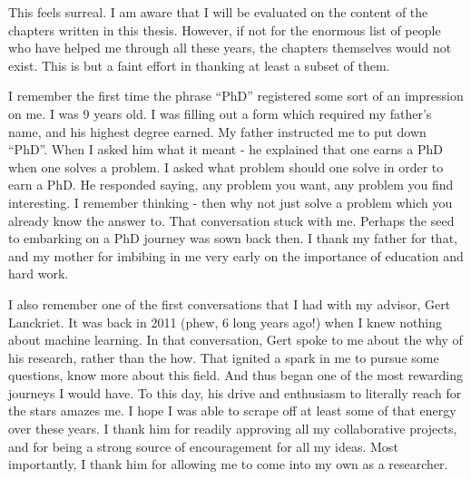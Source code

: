 \begin{frontmatter}
%


%
\tableofcontents
\listoffigures  %
\listoftables   %



%
%
\begin{acknowledgements}
This feels surreal.  I am aware that I will be evaluated on the content of the chapters written in this thesis.  However, if not for the enormous list of people who have helped me through all these years, the chapters themselves would not exist.  This is but a faint effort in thanking at least a subset of them.    

I remember the first time the phrase “PhD” registered some sort of an impression on me.  I was 9 years old.  I was filling out a form which required my father’s name, and his highest degree earned.  My father instructed me to put down “PhD”.  When I asked him what it meant - he explained that one earns a PhD when one solves a problem.  I asked what problem should one solve in order to earn a PhD.  He responded saying, any problem you want, any problem you find interesting.  I remember thinking - then why not just solve a problem which you already know the answer to.  That conversation stuck with me.  Perhaps the seed to embarking on a PhD journey was sown back then.  I thank my father for that, and my mother for imbibing in me very early on the importance of education and hard work.

I also remember one of the first conversations that I had with my advisor, Gert Lanckriet.  It was back in 2011 (phew, 6 long years ago!) when I knew nothing about machine learning.  In that conversation, Gert spoke to me about the why of his research, rather than the how.  That ignited a spark in me to pursue some questions, know more about this field.  And thus began one of the most rewarding journeys I would have.  To this day, his drive and enthusiasm to literally reach for the stars amazes me.  I hope I was able to scrape off at least some of that energy over these years.  I thank him for readily approving all my collaborative projects, and for being a strong source of encouragement for all my ideas.   Most importantly, I thank him for allowing me to come into my own as a researcher.  


\end{acknowledgements}
\end{frontmatter}
